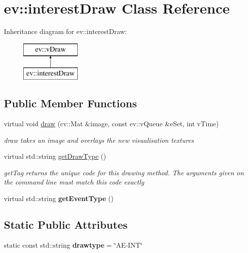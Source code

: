 \hypertarget{classev_1_1interestDraw}{}\section{ev\+:\+:interest\+Draw Class Reference}
\label{classev_1_1interestDraw}
Inheritance diagram for ev\+:\+:interest\+Draw\+:\begin{figure}[H]
\begin{center}
\leavevmode
\includegraphics[height=2.000000cm]{classev_1_1interestDraw}
\end{center}
\end{figure}
\subsection*{Public Member Functions}
\begin{DoxyCompactItemize}
\item 
virtual void \hyperlink{classev_1_1interestDraw_aeca2c7248d34d6817e853aad6a254380}{draw} (cv\+::\+Mat \&image, const ev\+::v\+Queue \&e\+Set, int v\+Time)
\begin{DoxyCompactList}\small\item\em draw takes an image and overlays the new visualisation textures \end{DoxyCompactList}\item 
virtual std\+::string \hyperlink{classev_1_1interestDraw_a97dbea009b993f0d8f4b6967b2b241ad}{get\+Draw\+Type} ()
\begin{DoxyCompactList}\small\item\em get\+Tag returns the unique code for this drawing method. The arguments given on the command line must match this code exactly \end{DoxyCompactList}\item 
\mbox{\label{classev_1_1interestDraw_a3338d66355cfdfd6c9c2b8c0ae221dff}} 
virtual std\+::string {\bfseries get\+Event\+Type} ()
\end{DoxyCompactItemize}
\subsection*{Static Public Attributes}
\begin{DoxyCompactItemize}
\item 
\mbox{\label{classev_1_1interestDraw_a24696c1d91d3c7866461e64e18128213}} 
static const std\+::string {\bfseries drawtype} = \char`\"{}AE-\/I\+NT\char`\"{}
\end{DoxyCompactItemize}
